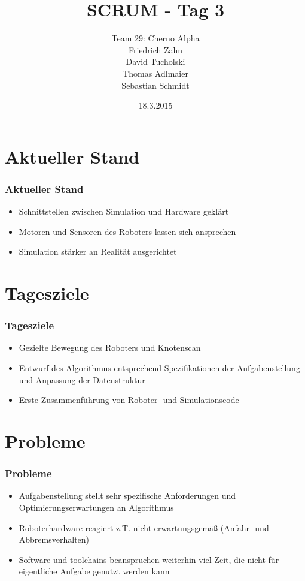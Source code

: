 \documentclass[ddcfooter,nototalpage]{tudbeamer}
\begin{document}
\title{SCRUM - Tag 3}
\author{Team 29: Cherno Alpha \\ 
Friedrich Zahn \\ 
David Tucholski \\
Thomas Adlmaier \\ 
Sebastian Schmidt
}

\date{18.3.2015}
\maketitle

\section{Aktueller Stand}
\begin{frame}
\frametitle{Aktueller Stand}
\normalsize
\begin{itemize}
  \item Schnittstellen zwischen Simulation und Hardware geklärt
  \item Motoren und Sensoren des Roboters lassen sich ansprechen
  \item Simulation stärker an Realität ausgerichtet
\end{itemize}
\end{frame}

\section{Tagesziele}
\begin{frame}
\frametitle{Tagesziele}
\normalsize
\begin{itemize}
  \item Gezielte Bewegung des Roboters und Knotenscan
  \item Entwurf des Algorithmus entsprechend Spezifikationen der Aufgabenstellung und Anpassung der Datenstruktur
  \item Erste Zusammenführung von Roboter- und Simulationscode
\end{itemize}
\end{frame}

\section{Probleme}
\begin{frame}
\frametitle{Probleme}
\normalsize
\begin{itemize}
  \item Aufgabenstellung stellt sehr spezifische Anforderungen und Optimierungserwartungen an Algorithmus
  \item Roboterhardware reagiert z.T. nicht erwartungsgemäß (Anfahr- und Abbremsverhalten)
  \item Software und toolchains beanspruchen weiterhin viel Zeit, die nicht für eigentliche Aufgabe genutzt werden kann
\end{itemize}
\end{frame}
\end{document}
